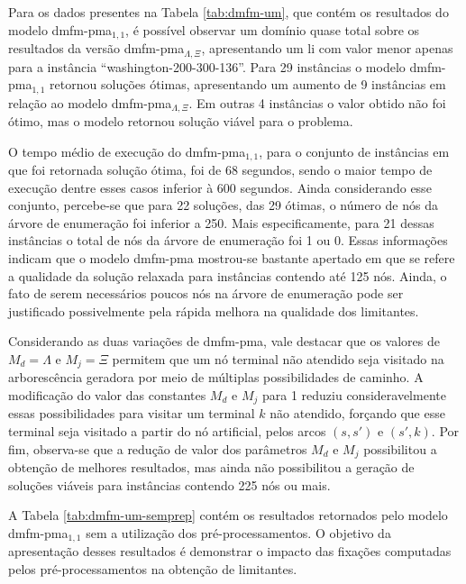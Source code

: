Para os dados presentes na Tabela \ref{tab:dmfm-um}, que contém os resultados do
modelo \gls{dmfm-pma}$_{1, 1}$, é possível observar um domínio quase total sobre
os  resultados  da  versão   \gls{dmfm-pma}$_{\Lambda,  \Xi}$,  apresentando  um
\gls{li}  com valor  menor apenas  para a  instância ``washington-200-300-136''.
Para 29  instâncias o modelo  \gls{dmfm-pma}$_{1, 1}$ retornou  soluções ótimas,
apresentando   um   aumento    de   9   instâncias   em    relação   ao   modelo
\gls{dmfm-pma}$_{\Lambda, \Xi}$. Em  outras 4 instâncias o valor  obtido não foi
ótimo, mas o modelo retornou solução viável para o problema.

O  tempo médio  de  execução  do \gls{dmfm-pma}$_{1,  1}$,  para  o conjunto  de
instâncias em que foi retornada solução ótima, foi de 68 segundos, sendo o maior
tempo de execução dentre esses casos inferior à 600 segundos. Ainda considerando
esse conjunto, percebe-se que  para 22 soluções, das 29 ótimas,  o número de nós
da árvore de enumeração foi inferior a 250. Mais especificamente, para 21 dessas
instâncias o total de nós da árvore  de enumeração foi 1 ou 0. Essas informações
indicam que o modelo \gls{dmfm-pma} mostrou-se  bastante apertado em que se refere a
qualidade da  solução relaxada para  instâncias contendo  até 125 nós.  Ainda, o
fato  de  serem  necessários  poucos  nós  na  árvore  de  enumeração  pode  ser
justificado possivelmente pela rápida melhora na qualidade dos limitantes.

Considerando as duas  variações de \gls{dmfm-pma}, vale destacar  que os valores
de $M_d = \Lambda$  e $M_j = \Xi$ permitem que um nó  terminal não atendido seja
visitado  na arborescência  geradora  por meio  de  múltiplas possibilidades  de
caminho. A  modificação do  valor das  constantes $M_d$ e  $M_j$ para  1 reduziu
consideravelmente  essas  possibilidades  para   visitar  um  terminal  $k$  não
atendido, forçando  que esse terminal seja  visitado a partir do  nó artificial,
pelos arcos $(s,  s')$ e $(s', k)$.  Por fim, observa-se que a  redução de valor
dos parâmetros $M_d$ e $M_j$ possibilitou a obtenção de melhores resultados, mas
ainda não  possibilitou a geração  de soluções viáveis para  instâncias contendo
225 nós ou mais.


A Tabela  \ref{tab:dmfm-um-semprep} contém os resultados  retornados pelo modelo
\gls{dmfm-pma}$_{1, 1}$ sem  a utilização dos pré-processamentos.  O objetivo da
apresentação desses  resultados é demonstrar  o impacto das  fixações computadas
pelos pré-processamentos na obtenção de limitantes.

